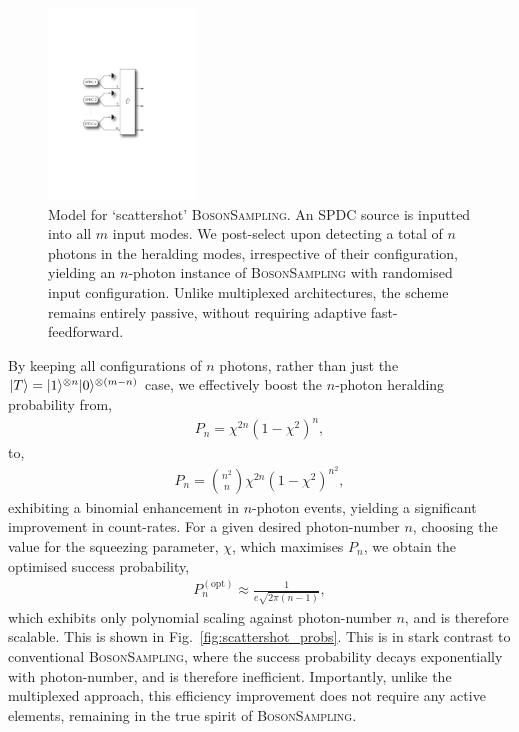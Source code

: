 \begin{figure}[!htb]
\includegraphics[width=0.35\textwidth]{scattershot_model}
\caption{Model for `scattershot' \textsc{BosonSampling}. An SPDC source is inputted into all $m$ input modes. We post-select upon detecting a total of $n$ photons in the heralding modes, irrespective of their configuration, yielding an $n$-photon instance of \textsc{BosonSampling} with randomised input configuration. Unlike multiplexed architectures, the scheme remains entirely passive, without requiring adaptive fast-feedforward.} \label{fig:scattershot_model}
\end{figure}

By keeping all configurations of $n$ photons, rather than just the \mbox{$|T\rangle=|1\rangle^{\otimes n} |0\rangle^{\otimes (m-n)}$} case, we effectively boost the $n$-photon heralding probability from,
\begin{align}
	P_n = \chi^{2n}(1-\chi^2)^n,	
\end{align}
to,
\begin{align}
	P_n = \binom{n^2}{n}\chi^{2n}(1-\chi^2)^{n^2},	
\end{align}
exhibiting a binomial enhancement in $n$-photon events, yielding a significant improvement in count-rates. For a given desired photon-number $n$, choosing the value for the squeezing parameter, $\chi$, which maximises $P_n$, we obtain the optimised success probability,
\begin{align}
	P_n^{(\text{opt})} \approx \frac{1}{e\sqrt{2\pi(n-1)}},
\end{align}
which exhibits only polynomial scaling against photon-number $n$, and is therefore scalable. This is shown in Fig.~\ref{fig:scattershot_probs}. This is in stark contrast to conventional \textsc{BosonSampling}, where the success probability decays exponentially with photon-number, and is therefore inefficient. Importantly, unlike the multiplexed approach, this efficiency improvement does not require any active elements, remaining in the true spirit of \textsc{BosonSampling}.

